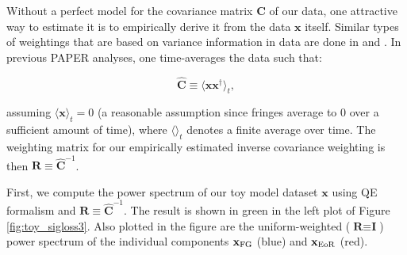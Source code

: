 \documentclass[preprint2,numberedappendix,tighten]{aastex6}
\begin{document}
Without a perfect model for the covariance matrix $\textbf{C}$ of our data, one attractive way to estimate it is to empirically derive it from the data $\textbf{x}$ itself. Similar types of weightings that are based on variance information in data are done in \citet{chang_et_al2010} and \citet{switzer_et_al2015}. In previous PAPER analyses, one time-averages the data such that:

\begin{equation}
\widehat{\textbf{C}} \equiv \langle\textbf{xx}^{\dagger}\rangle_{t},
\end{equation}

\noindent assuming $\langle\textbf{x}\rangle_{t} = 0$ (a reasonable assumption since fringes average to $0$ over a sufficient 
amount of time), where $\langle \rangle_{t}$ denotes a finite average over time. The weighting matrix for our empirically estimated inverse covariance weighting is then $
\textbf{R} \equiv \widehat{\textbf{C}}^{-1}$.

First, we compute the power spectrum of our toy model dataset $\textbf{x}$ using QE formalism and $\textbf{R} \equiv \widehat{\textbf{C}}^{-1}$. 
The result is shown in green in the left plot of Figure \ref{fig:toy_sigloss3}. Also plotted in the figure are the uniform-weighted ($\textbf{R} \equiv \textbf{I}$) power spectrum of the individual components $
\textbf{x}_{\rm FG}$ (blue) and $\textbf{x}_{\rm EoR}$ (red). 
\end{document}
